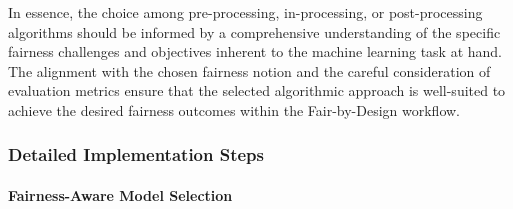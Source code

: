 In essence, the choice among pre-processing, in-processing, or post-processing algorithms should be informed by a comprehensive understanding of the specific fairness challenges and objectives inherent to the machine learning task at hand. The alignment with the chosen fairness notion and the careful consideration of evaluation metrics ensure that the selected algorithmic approach is well-suited to achieve the desired fairness outcomes within the Fair-by-Design workflow.


\subsubsection{Detailed Implementation Steps}


\paragraph{Fairness-Aware Model Selection}

